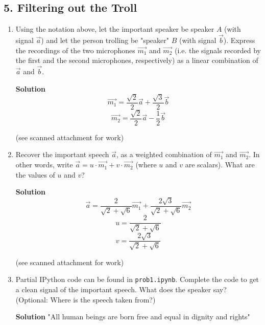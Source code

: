 \documentclass{article}\usepackage{amsmath,amssymb,amsthm,tikz,tkz-graph,color,chngpage,soul,hyperref,csquotes,graphicx,floatrow}\newcommand*{\QEDB}{\hfill\ensuremath{\square}}\newtheorem*{prop}{Proposition}\renewcommand{\theenumi}{\alph{enumi}}\usepackage[shortlabels]{enumitem}\usepackage[nobreak=true]{mdframed}\usetikzlibrary{matrix,calc}\MakeOuterQuote{"}\usepackage[margin=1in]{geometry} \newtheorem{theorem}{Theorem}
\begin{document}
\subsection*{5. Filtering out the Troll}
\begin{enumerate}
\item Using the notation above, let the important speaker be speaker $A$ (with signal $\vec{a}$) and let the person trolling be "speaker" $B$ (with signal $\vec{b}$). Express the recordings of the two microphones $\vec{m_1}$ and $\vec{m_2}$ (i.e. the signals recorded by the first and the second microphones, respectively) as a linear combination of $\vec{a}$ and $\vec{b}$.
\begin{mdframed}
\textbf{Solution} $$\vec{m_1} = \frac{\sqrt{2}}{2}\vec{a} + \frac{\sqrt{3}}{2}\vec{b}$$$$\vec{m_2} = \frac{\sqrt{2}}{2}\vec{a} - \frac{1}{2}\vec{b}$$

(see scanned attachment for work)%
\end{mdframed}
\item Recover the important speech $\vec{a}$, as a weighted combination of $\vec{m_1}$ and $\vec{m_2}$. In other words, write $\vec{a} = u \cdot \vec{m_1} + v \cdot \vec{m_2}$ (where $u$ and $v$ are scalars). What are the values of $u$ and $v$?
\begin{mdframed}
\textbf{Solution} $$\vec{a} = \frac{2}{\sqrt{2}+\sqrt{6}}\vec{m_1} + \frac{2\sqrt{3}}{\sqrt{2}+\sqrt{6}}\vec{m_2}$$$$u = \frac{2}{\sqrt{2}+\sqrt{6}}$$$$v = \frac{2\sqrt{3}}{\sqrt{2}+\sqrt{6}}$$

(see scanned attachment for work)%
\end{mdframed}
\item Partial IPython code can be found in \texttt{prob1.ipynb}. Complete the code to get a clean signal of the important speech. What does the speaker say? (Optional: Where is the speech taken from?)
\begin{mdframed}
\textbf{Solution} "All human beings are born free and equal in dignity and rights"%
\end{mdframed}
\end{enumerate}
\clearpage
\end{document}
